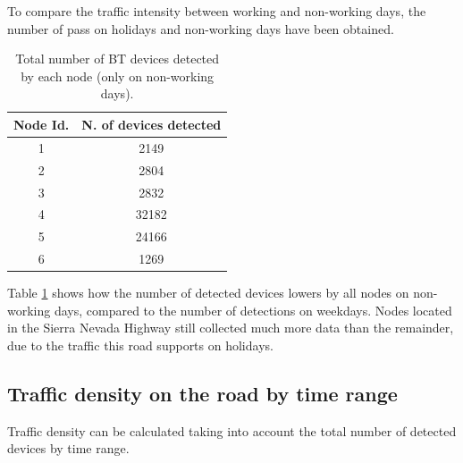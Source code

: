 \documentclass{llncs}
\begin{document}
To compare the traffic intensity between working and non-working days, the number of pass on holidays and non-working days have been obtained.

 \begin{table}
 \begin{center}
 \begin{tabular}{|c|c|}
 \hline
Node Id.  &  N. of devices detected  \\
 \hline
    1     &    2149  \\
 \hline
    2     &    2804  \\
 \hline
    3     &    2832  \\
 \hline
    4     &    32182  \\
 \hline
    5     &    24166  \\
 \hline
    6     &    1269  \\
 \hline
 \end{tabular}
 \end{center}
 \caption{Total number of BT devices detected by each node (only on non-working days).
 \label{VehiculosFestivos}}
 \end{table}


Table \ref{VehiculosFestivos} shows how the number of detected devices lowers by all nodes on non-working days, compared to the number of detections on weekdays.
Nodes located in the Sierra Nevada Highway still collected much more data than the remainder, due to the traffic this road supports on holidays.


\subsection{Traffic density on the road by time range}

Traffic density can be calculated taking into account the total number of detected devices by time range.
\end{document}
